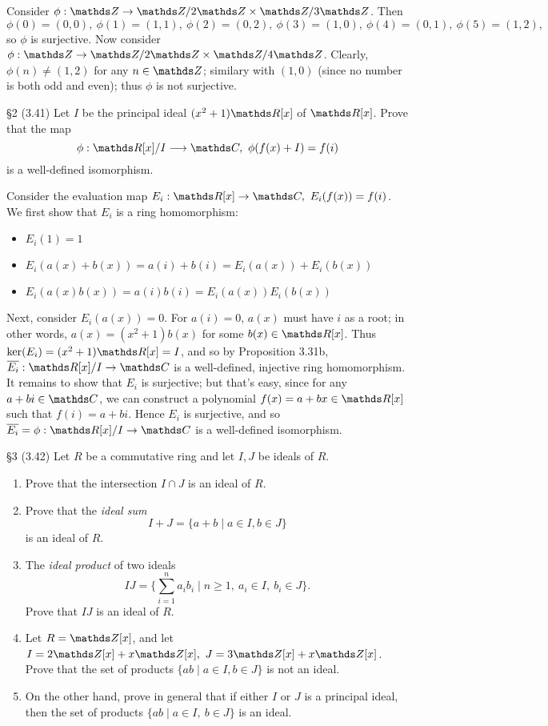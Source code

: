 \documentclass{homework}
\begin{document}
\begin{solution}
\begin{enumerate}[label=(\alph*)]
      Consider $\phi: \Z\to \Z / 2\Z \times  \Z / 3\Z$. Then \[
        \phi(0)=(0,0),\ \phi(1)=(1,1),\ \phi(2)=(0,2),\ \phi(3)=(1,0),\ \phi(4)=(0,1),\ \phi(5)=(1,2)
      ,\] so $\phi$ is surjective. Now consider $\phi: \Z \to \Z / 2\Z \times \Z/4\Z$. Clearly,
      $\phi(n)\neq (1,2)$ for any $n\in \Z$; similary with $(1,0)$ (since no number is both odd and
      even); thus $\phi$ is not surjective.
  \end{enumerate}
\end{solution}

\begin{problem}{\S 2}
  (3.41) Let $I$ be the principal ideal $(x^2+1)\R[x]$ of $\R[x]$. Prove that the map \[
    \phi: \R[x] / I \longrightarrow \C,\ \phi(f(x)+I)=f(i)
  \] is a well-defined isomorphism.
\end{problem}
\begin{solution}
  Consider the evaluation map $E_i:\R[x]\to \C,\ E_i(f(x))=f(i)$. We first show that $E_i$ is a ring
  homomorphism:
  \begin{itemize}
    \item $E_i(1)=1$
    \item $E_i(a(x)+b(x))=a(i)+b(i)=E_i(a(x))+E_i(b(x))$
    \item $E_i(a(x)b(x))=a(i)b(i)=E_i(a(x))E_i(b(x))$
  \end{itemize}
  Next, consider $E_i(a(x))=0$. For $a(i)=0$, $a(x)$ must have $i$ as a root; in other words,
  $a(x)=(x^2+1)b(x)$ for some $b(x)\in \R[x]$. Thus $\ker(E_i)=(x^2+1)\R[x]=I$, and so by Proposition
  3.31b, $\overline{E_i}:\R[x] / I \to \C$ is a well-defined, injective ring homomorphism. It
  remains to show that $E_i$ is surjective; but that's easy, since for any $a+bi\in \C$, we can
  construct a polynomial $f(x)=a+bx\in \R[x]$ such that $f(i)=a+bi$. Hence $E_i$ is surjective, and
  so $\overline{E_i}=\phi:\R[x] / I \to \C$ is a well-defined isomorphism.
\end{solution}

\begin{problem}{\S 3}
  (3.42) Let $R$ be a commutative ring and let $I,J$ be ideals of $R$.
  \begin{enumerate}[label=(\alph*)]
    \item Prove that the intersection $I\cap J$ is an ideal of $R$.
    \item Prove that the \textit{ideal sum}  \[
        I+J=\{a+b\mid a\in I,b\in J\} 
      \] is an ideal of $R$.
    \item The \textit{ideal product} of two ideals \[
        IJ = \{\sum_{i=1}^{n} a_ib_i\mid n\ge 1,\ a_i\in I,\ b_i\in J\} 
      .\] Prove that $IJ$ is an ideal of $R$.
      \item Let $R=\Z[x]$, and let $I=2\Z[x]+x\Z[x],\ J=3\Z[x]+x\Z[x]$. Prove that the set of
        products $\{ab\mid a\in I,b\in J\} $ is not an ideal.
      \item On the other hand, prove in general that if either $I$ or $J$ is a principal ideal, then
        the set of products $\{ab\mid a\in I,\ b\in J\} $ is an ideal.
  \end{enumerate}
\end{problem}
\end{document}

